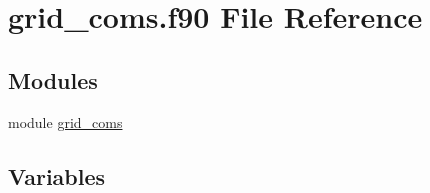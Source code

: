 \hypertarget{grid__coms_8f90}{}\section{grid\+\_\+coms.\+f90 File Reference}
\label{grid__coms_8f90}
\subsection*{Modules}
\begin{DoxyCompactItemize}
\item 
module \hyperlink{namespacegrid__coms}{grid\+\_\+coms}
\end{DoxyCompactItemize}
\subsection*{Variables}
